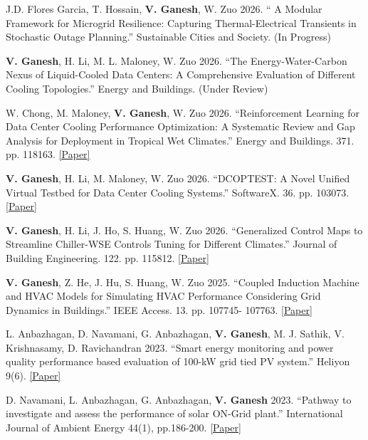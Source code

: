 \documentclass[]{Keval-resume}
\begin{document}
{{\begin{etaremune}
\setlength{\itemsep}{0pt}
    \setlength{\parsep}{0pt}
\item J.D. Flores Garcia, T. Hossain, \textbf{V. Ganesh}, W. Zuo 2026. “ A Modular Framework for Microgrid Resilience: Capturing Thermal-Electrical Transients in Stochastic Outage Planning.” Sustainable Cities and Society. (In Progress)
\item \textbf{V. Ganesh}, H. Li, M. L. Maloney, W. Zuo 2026. “The Energy-Water-Carbon Nexus of Liquid-Cooled Data Centers: A Comprehensive Evaluation of Different Cooling Topologies.” Energy and Buildings. (Under Review)
\item W. Chong, M. Maloney, \textbf{V. Ganesh}, W. Zuo 2026. “Reinforcement Learning for Data Center Cooling Performance Optimization: A Systematic Review and Gap Analysis for Deployment in Tropical Wet Climates.” Energy and Buildings. 371. pp. 118163. \href{https://doi.org/10.1016/j.enbuild.2026.118163}{[Paper]}
\item \textbf{V. Ganesh}, H. Li, M. Maloney, W. Zuo 2026. “DCOPTEST: A Novel Unified Virtual Testbed for Data Center Cooling Systems.” SoftwareX. 36. pp. 103073. \href{https://doi.org/10.1016/j.softx.2026.103073}{[Paper]}
\item \textbf{V. Ganesh}, H. Li, J. Ho, S. Huang, W. Zuo 2026. “Generalized Control Maps to Streamline Chiller-WSE
Controls Tuning for Different Climates.” Journal of Building Engineering. 122. pp. 115812. \href{https://doi.org/10.1016/j.jobe.2026.115812}{[Paper]}
\item \textbf{V. Ganesh}, Z. He, J. Hu, S. Huang, W. Zuo 2025. “Coupled Induction Machine and HVAC Models for
Simulating HVAC Performance Considering Grid Dynamics in Buildings.” IEEE Access. 13. pp. 107745-
107763. \href{https://doi.org/10.1109/ACCESS.2025.3581502}{[Paper]}
\item L. Anbazhagan, D. Navamani, G. Anbazhagan, \textbf{V. Ganesh}, M. J. Sathik, V. Krishnasamy, D. Ravichandran 2023. “Smart energy monitoring and power quality performance based evaluation of 100-kW grid tied PV system.” Heliyon 9(6). \href{https://doi.org/10.1016/j.heliyon.2023.e17274}{[Paper]}
\item D. Navamani, L. Anbazhagan, G. Anbazhagan, \textbf{V. Ganesh} 2023. “Pathway to investigate and assess the performance of solar ON-Grid plant.” International Journal of Ambient Energy 44(1), pp.186-200. \href{https://doi.org/10.1080/01430750.2022.2125439}{[Paper]}
\end{etaremune}


}}
\end{document}
